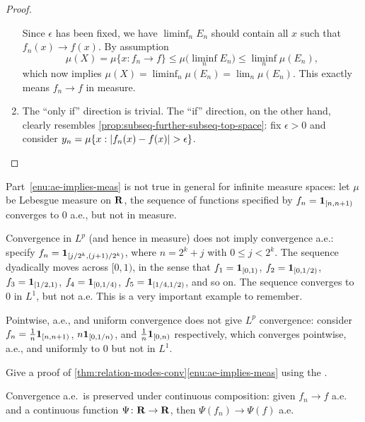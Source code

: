 \begin{proof}
\begin{enumerate}
        Since $\epsilon$ has been fixed, we have $\liminf_n E_n$ should contain all $x$ such that $f_n(x) \to f(x)$. By assumption \[\mu(X) = \mu\{x:f_n \to f\} \leq \mu\bigl(\liminf_n E_n\bigr) \leq \liminf_n \mu(E_n),\] which now implies $\mu(X) = \liminf_n \mu(E_n) = \lim_n \mu(E_n)$. This exactly means $f_n \to f$ in measure.
        \item The ``only if'' direction is trivial. The ``if'' direction, on the other hand, clearly resembles \cref{prop:subseq-further-subseq-top-space}: fix $\epsilon > 0$ and consider $y_n = \mu\{x:\lvert f_n(x) - f(x) \rvert > \epsilon\}$. \qedhere
     \end{enumerate}
\end{proof}

\begin{exa}
    Part~\ref{enu:ae-implies-meas} is not true in general for infinite measure spaces: let $\mu$ be Lebesgue measure on $\mathbf{R}$, the sequence of functions specified by $f_n = \mathbf{1}_{[n,n+1)}$ converges to $0$ a.e., but not in measure.

    Convergence in $L^p$ (and hence in measure) does not imply convergence a.e.: specify $f_n =\mathbf{1}_{[j/2^k,(j+1)/2^k)}$, where $n = 2^k+j$ with $0\leq j < 2^k$. The sequence dyadically moves across $[0,1)$, in the sense that $f_1 = \mathbf{1}_{[0,1)}$, $f_2 = \mathbf{1}_{[0,1/2)}$, $f_3 = \mathbf{1}_{[1/2,1)}$, $f_4 = \mathbf{1}_{[0,1/4)}$, $f_5 = \mathbf{1}_{[1/4,1/2)}$, and so on. The sequence converges to $0$ in $L^1$, but not a.e. This is a very important example to remember.

    Pointwise, a.e., and uniform convergence does not give $L^p$ convergence: consider $f_n = \frac{1}{n} \mathbf{1}_{[n,n+1)}$, $n\mathbf{1}_{[0,1/n)}$, and $\frac{1}{n} \mathbf{1}_{[0,n)}$ respectively, which converges pointwise, a.e., and uniformly to $0$ but not in $L^1$.
\end{exa}

\begin{xca}
    Give a proof of \cref{thm:relation-modes-conv}\ref{enu:ae-implies-meas} using the .
\end{xca}

\begin{fact}
    Convergence a.e.\ is preserved under continuous composition: given $f_n \to f$ a.e. and a continuous function $\Psi\colon \mathbf{R} \to \mathbf{R}$, then $\Psi(f_n)\to \Psi(f)$ a.e.
\end{fact}

